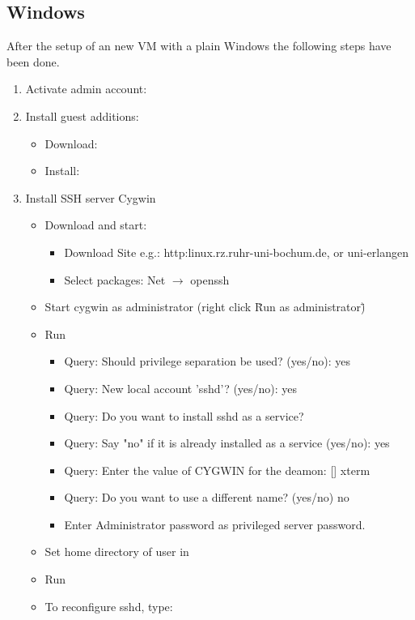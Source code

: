 \subsection*{Windows}
After the setup of an new VM with a plain Windows the following steps have been done.
\begin{enumerate}
\item Activate admin account:\\
\item Install guest additions:
\begin{itemize}
\item Download: 
\item Install: 
\end{itemize} 
\item Install SSH server Cygwin 
\begin{itemize}
	\item Download and start: 
	\begin{itemize}
		\item Download Site e.g.: http:linux.rz.ruhr-uni-bochum.de, or uni-erlangen
		\item Select packages: Net $\rightarrow$ openssh
	\end{itemize}
	\item Start cygwin as administrator (right click \"Run as administrator\")
	\item Run 
	\begin{itemize}
    	\item Query: Should privilege separation be used? (yes/no): yes
    	\item Query: New local account 'sshd'? (yes/no): yes
    	\item Query: Do you want to install sshd as a service?
    	\item Query: Say "no" if it is already installed as a service (yes/no): yes
    	\item Query: Enter the value of CYGWIN for the deamon: [] xterm
    	\item Query: Do you want to use a different name? (yes/no) no
    	\item Enter Administrator password as privileged server password.
	\end{itemize}
	\item Set home directory of user in 
	\item Run 
	\item To reconfigure sshd, type:\\
		\\
\end{itemize}


\end{enumerate}
